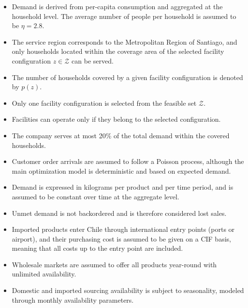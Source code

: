 \documentclass[12pt]{article}
\begin{document}
\begin{itemize}
    \item Demand is derived from per-capita consumption and aggregated at the household level. The average number of people per household is assumed to be $\eta = 2.8$.

    \item The service region corresponds to the Metropolitan Region of Santiago, and only households located within the coverage area of the selected facility configuration $z \in \mathcal{Z}$ can be served.

    \item The number of households covered by a given facility configuration is denoted by $p(z)$.

    \item Only one facility configuration is selected from the feasible set $\mathcal{Z}$.

    \item Facilities can operate only if they belong to the selected configuration.

    \item The company serves at most 20\% of the total demand within the covered households.

    \item Customer order arrivals are assumed to follow a Poisson process, although the main optimization model is deterministic and based on expected demand.

    \item Demand is expressed in kilograms per product and per time period, and is assumed to be constant over time at the aggregate level.

    \item Unmet demand is not backordered and is therefore considered lost sales.

    \item Imported products enter Chile through international entry points (ports or airport), and their purchasing cost is assumed to be given on a CIF basis, meaning that all costs up to the entry point are included.

    \item Wholesale markets are assumed to offer all products year-round with unlimited availability.

    \item Domestic and imported sourcing availability is subject to seasonality, modeled through monthly availability parameters.


\end{itemize}
\end{document}
